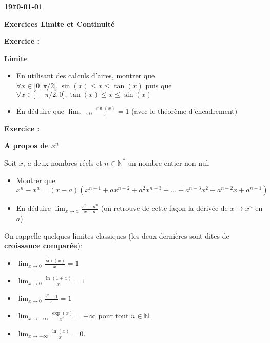 \documentclass[a4paper,12pt]{article}
\def\Exam{Exercices \og Limite et Continuité\fg{}}
\def\Date{\today}
\begin{document}
\setcounter{nexo}{1}
\newcommand{\Exo}{\medskip
  {\bf Exercice \arabic{nexo} : }
  \addtocounter{nexo}{1}}
\newcommand{\Pb}{{\bf Problème \arabic{nexo} : } 
\addtocounter{nexo}{1} \bigskip}
{\bf  \hfill \Date \quad ~}
%
\vskip 1cm
%
\centerline{\bf \LARGE \Exam}
%
\vskip 1.5cm
%




\Exo \textbf{Limite}

\begin{itemize}
\item En utilisant des calculs d'aires, montrer que $\forall  x \in [0, \pi/2[, \sin(x) \leq x \leq \tan(x)$ puis que $\forall  x \in ]-\pi/2, 0], \tan(x) \leq x \leq \sin(x)$
\item En déduire que $\displaystyle \lim_{x \to 0} \frac{\sin(x)}{x} = 1$ (avec le théorème d'encadrement) 
\end{itemize}

\Exo \textbf{A propos de $x^n$}

Soit $x$, $a$ deux nombres réels et $n \in \mathbb{N}^*$ un nombre entier non nul. 

\begin{itemize}
\item Montrer que $x^n - x^a = (x - a)(x^{n-1} + ax^{n-2} + a^2x^{n-3} + \dots + a^{n-3}x^{2} + a^{n-2}x + a^{n-1})$
\item En déduire $\displaystyle \lim_{x \to a} \frac{x^{n} - a^n}{x - a}$ (on retrouve de cette façon la dérivée de $x \mapsto x^n$ en $a$)
\end{itemize}

On rappelle quelques limites classiques (les deux dernières sont dites de \textbf{croissance comparée}): 
\begin{itemize}
\item $\displaystyle \lim_{x \to 0} \frac{\sin(x)}{x} = 1$ 
\item $\displaystyle \lim_{x \to 0} \frac{\ln(1+x)}{x} = 1$ 
\item $\displaystyle \lim_{x \to 0} \frac{e^x - 1}{x} = 1$ 
\item $\displaystyle \lim_{x \to +\infty} \frac{\exp(x)}{x^n} = +\infty$ pour tout $n \in \mathbb{N}$. 
\item $\displaystyle \lim_{x \to +\infty} \frac{\ln(x)}{x} = 0$. 
\end{itemize}
\end{document}
